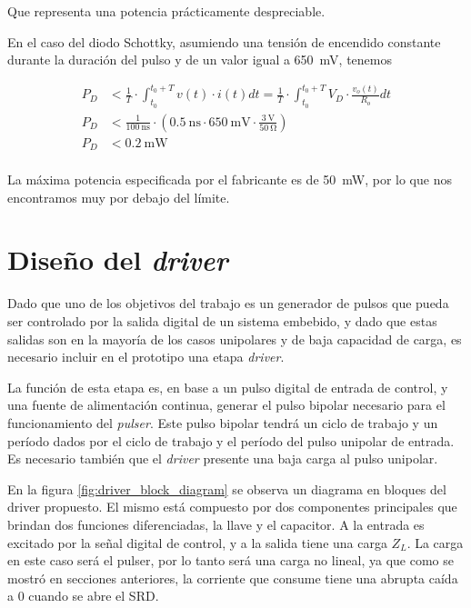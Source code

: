 Que representa una potencia prácticamente despreciable.

En el caso del diodo Schottky, asumiendo una tensión de encendido constante
durante la duración del pulso y de un valor igual a \qty{650}{\milli\volt},
tenemos

\begin{equation}
    \begin{aligned}
        P_{D} &< \frac{1}{T} \cdot \int_{t_0}^{t_0+T} v(t) \cdot i(t) dt =
        \frac{1}{T} \cdot \int_{t_0}^{t_0+T} V_D \cdot \frac{v_o(t)}{R_o} dt \\
        P_{D} &< \frac{1}{\qty{100}{\nano\second}} \cdot \left( \qty{0.5}{\nano\second} \cdot
        \qty{650}{\milli\volt} \cdot \frac{\qty{3}{\volt}}{
            \qty{50}{\ohm}} \right) \\
        P_{D} &< \qty{0.2}{\milli\watt} \\
    \end{aligned}
\end{equation}

La máxima potencia especificada por el fabricante es de \qty{50}{\milli\watt},
por lo que nos encontramos muy por debajo del límite.

\section{Diseño del \textit{driver}}

Dado que uno de los objetivos del trabajo es un generador de pulsos que pueda
ser controlado por la salida digital de un sistema embebido, y dado que estas
salidas son en la mayoría de los casos unipolares y de baja capacidad de carga,
es necesario incluir en el prototipo una etapa \textit{driver}.

La función de esta etapa es, en base a un pulso digital de entrada de control, y
una fuente de alimentación continua, generar el pulso bipolar necesario para el
funcionamiento del \textit{pulser}. Este pulso bipolar tendrá un ciclo de
trabajo y un período dados por el ciclo de trabajo y el período del pulso
unipolar de entrada. Es necesario también que el \textit{driver} presente una
baja carga al pulso unipolar.

En la figura \ref{fig:driver_block_diagram} se observa un diagrama en bloques
del driver propuesto. El mismo está compuesto por dos componentes principales
que brindan dos funciones diferenciadas, la llave y el capacitor. A la entrada
es excitado por la señal digital de control, y a la salida tiene una carga
$Z_L$. La carga en este caso será el pulser, por lo tanto será una carga no
lineal, ya que como se mostró en secciones anteriores, la corriente que consume
tiene una abrupta caída a 0 cuando se abre el SRD.

